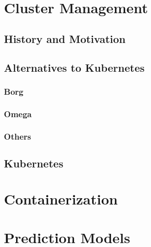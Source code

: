 \documentclass[twoside]{report}
\begin{document}
\section{Cluster Management}

\subsection{History and Motivation}

\subsection{Alternatives to Kubernetes}

\subsubsection{Borg}

\subsubsection{Omega}

\subsubsection{Others}

\subsection{Kubernetes}

\section{Containerization}

\section{Prediction Models}



\end{document}
